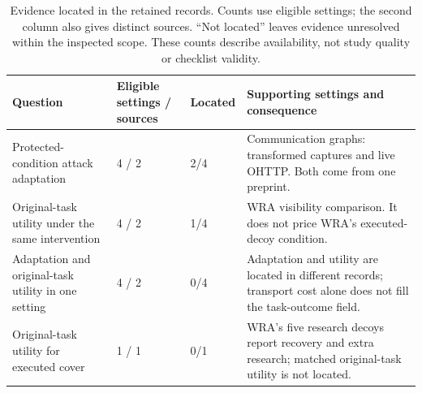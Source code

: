 \begin{table}[t]\centering\small
\caption{Evidence located in the retained records. Counts use eligible settings; the second column also gives distinct sources. ``Not located'' leaves evidence unresolved within the inspected scope. These counts describe availability, not study quality or checklist validity.}\label{tab:availability}
\setlength{\tabcolsep}{4pt}
\begin{tabularx}{\textwidth}{@{}P{.28\textwidth}P{.15\textwidth}P{.11\textwidth}Y@{}}\toprule
Question & Eligible settings / sources & Located & Supporting settings and consequence \\\midrule
Protected-condition attack adaptation & 4 / 2 & 2/4 & Communication graphs: transformed captures and live OHTTP. Both come from one preprint. \\\addlinespace[3pt]
Original-task utility under the same intervention & 4 / 2 & 1/4 & WRA visibility comparison. It does not price WRA's executed-decoy condition. \\\addlinespace[3pt]
Adaptation and original-task utility in one setting & 4 / 2 & 0/4 & Adaptation and utility are located in different records; transport cost alone does not fill the task-outcome field. \\\addlinespace[3pt]
Original-task utility for executed cover & 1 / 1 & 0/1 & WRA's five research decoys report recovery and extra research; matched original-task utility is not located. \\\bottomrule
\end{tabularx}
\end{table}

